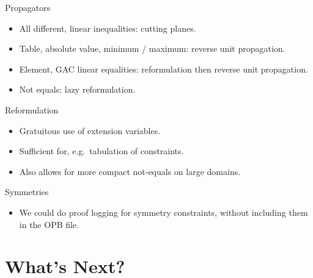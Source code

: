 \documentclass{beamer}
\begin{document}
\begin{frame}{Propagators}
    \begin{itemize}
        \item All different, linear inequalities: cutting planes.
        \item Table, absolute value, minimum / maximum: reverse unit propagation.
        \item Element, GAC linear equalities: reformulation then reverse unit propagation.
        \item Not equals: lazy reformulation.
    \end{itemize}
\end{frame}

\begin{frame}{Reformulation}
    \begin{itemize}
        \item Gratuitous use of extension variables.
        \item Sufficient for, e.g.\ tabulation of constraints.
        \item Also allows for more compact not-equals on large domains.
    \end{itemize}
\end{frame}

\begin{frame}{Symmetries}
    \begin{itemize}
        \item We could do proof logging for symmetry constraints, without including them in the OPB
            file.
    \end{itemize}
\end{frame}

\section{What's Next?}

\end{document}
